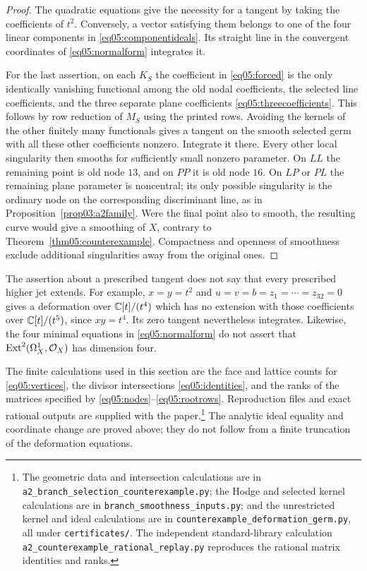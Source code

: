 \begin{proof}
The quadratic equations give the necessity for a tangent by taking the
coefficients of $t^2$.  Conversely, a vector satisfying them belongs to
one of the four linear components in \eqref{eq05:componentideals}.
Its straight line in the convergent coordinates of
\eqref{eq05:normalform} integrates it.

For the last assertion, on each $K_S$ the coefficient in
\eqref{eq05:forced} is the only identically vanishing functional among
the old nodal coefficients, the selected line coefficients, and the
three separate plane coefficients \eqref{eq05:threecoefficients}.
This follows by row reduction of $M_S$ using the printed rows.
Avoiding the kernels of the other finitely many functionals gives a
tangent on the smooth selected germ with all these other coefficients
nonzero.  Integrate it there.  Every other local singularity then
smooths for sufficiently small nonzero parameter.  On $LL$ the remaining
point is old node $13$, and on $PP$ it is old node $16$.  On $LP$ or $PL$
the remaining plane parameter is noncentral; its only possible
singularity is the ordinary node on the corresponding discriminant
line, as in Proposition~\ref{prop03:a2family}.  Were the final point also
to smooth, the resulting curve would give a smoothing of $X$, contrary
to Theorem~\ref{thm05:counterexample}.  Compactness and openness of
smoothness exclude additional singularities away from the original
ones.
\end{proof}

The assertion about a prescribed tangent does not say that every
prescribed higher jet extends.  For example, $x=y=t^2$ and
$u=v=b=z_1=\cdots=z_{32}=0$ gives a deformation over
$\mathbb{C}[t]/(t^4)$ which has no extension with those coefficients over
$\mathbb{C}[t]/(t^5)$, since $xy=t^4$.  Its zero tangent nevertheless integrates.
Likewise, the four minimal equations in \eqref{eq05:normalform} do not
assert that $\operatorname{Ext}^2(\Omega_X^1,\mathcal{O}_X)$ has dimension four.

The finite calculations used in this section are the face and lattice
counts for \eqref{eq05:vertices}, the divisor intersections
\eqref{eq05:identities}, and the ranks of the matrices specified by
\eqref{eq05:nodes}--\eqref{eq05:rootrows}.  Reproduction files and exact
rational outputs are supplied with the paper.\footnote{The geometric
data and intersection calculations are in
\texttt{a2\_branch\_selection\_counterexample.py}; the Hodge and selected
kernel calculations are in \texttt{branch\_smoothness\_inputs.py}; and
the unrestricted kernel and ideal calculations are in
\texttt{counterexample\_deformation\_germ.py}, all under
\texttt{certificates/}.  The independent standard-library calculation
\texttt{a2\_counterexample\_rational\_replay.py} reproduces the rational
matrix identities and ranks.}
The analytic ideal equality and coordinate change are proved above;
they do not follow from a finite truncation of the deformation equations.
